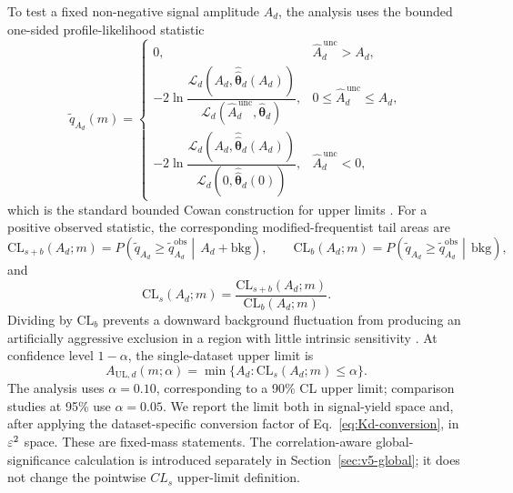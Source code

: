 To test a fixed non-negative signal amplitude $A_d$, the analysis uses
the bounded one-sided profile-likelihood statistic
\begin{equation}
\tilde q_{A_d}(m)=
\begin{cases}
0, &
\hat A_d^{\,\mathrm{unc}} > A_d, \\
-2\ln
\dfrac{\mathcal{L}_d\!\left(A_d,\hat{\hat{\bm{\theta}}}_d(A_d)\right)}
{\mathcal{L}_d\!\left(\hat A_d^{\,\mathrm{unc}},\hat{\bm{\theta}}_d\right)}, &
0\le \hat A_d^{\,\mathrm{unc}}\le A_d, \\
-2\ln
\dfrac{\mathcal{L}_d\!\left(A_d,\hat{\hat{\bm{\theta}}}_d(A_d)\right)}
{\mathcal{L}_d\!\left(0,\hat{\hat{\bm{\theta}}}_d(0)\right)}, &
\hat A_d^{\,\mathrm{unc}} < 0,
\end{cases}
\label{eq:qmu-single}
\end{equation}
which is the standard bounded Cowan construction for upper limits \cite{Cowan2011}.
For a positive observed statistic, the corresponding modified-frequentist tail areas are
\begin{equation}
\mathrm{CL}_{s+b}(A_d;m)
=
P\!\left(
\tilde q_{A_d}\ge \tilde q_{A_d}^{\mathrm{obs}}
\middle|\,
A_d+\mathrm{bkg}
\right),
\qquad
\mathrm{CL}_{b}(A_d;m)
=
P\!\left(
\tilde q_{A_d}\ge \tilde q_{A_d}^{\mathrm{obs}}
\middle|\,
\mathrm{bkg}
\right),
\end{equation}
and
\begin{equation}
\mathrm{CL}_{s}(A_d;m)=
\frac{\mathrm{CL}_{s+b}(A_d;m)}{\mathrm{CL}_{b}(A_d;m)}.
\label{eq:cls-definition}
\end{equation}
Dividing by $\mathrm{CL}_b$ prevents a downward background fluctuation from producing
an artificially aggressive exclusion in a region with little intrinsic sensitivity
\cite{Junk1999,Read2002}. At confidence level $1-\alpha$, the single-dataset upper
limit is
\begin{equation}
A_{\mathrm{UL},d}(m;\alpha)
=\min\{A_d:\mathrm{CL}_s(A_d;m)\le\alpha\}.
\label{eq:aul-single}
\end{equation}
The analysis uses $\alpha=0.10$, corresponding to a 90\% CL upper limit; comparison
studies at 95\% use $\alpha=0.05$. We report the limit both in
signal-yield space and, after applying the dataset-specific conversion factor of
Eq.~\eqref{eq:Kd-conversion}, in $\varepsilon^2$ space.
These are fixed-mass statements. The correlation-aware global-significance
calculation is introduced separately in Section~\ref{sec:v5-global}; it does
not change the pointwise $CL_s$ upper-limit definition.


